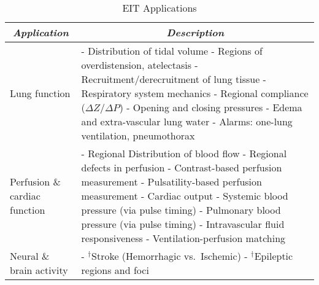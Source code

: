\documentclass[12pt]{article} \usepackage[margin=3cm]{geometry} \usepackage[margin=20pt,font=small,labelfont=bf]{caption}\def\TBLWIDA{35mm}\def\TBLWIDB{95mm}
\begin{document}
\begin{table}
\caption{EIT Applications}
\label{tbl:EIT_Applications}
\centering
\begin{tabular}{p{\TBLWIDA}p{\TBLWIDB}}
\multicolumn{1}{c}{\em Application} &
\multicolumn{1}{c}{\em Description} \\
\hline
Lung function &
 - Distribution of tidal volume \cite{Hahn1995Distribution}
      \newline
 - Regions of overdistension, atelectasis
                \cite{Gomez2012Overdistension, Costa2009Bedside}
      \newline
 - Recruitment/derecruitment of lung tissue \cite{Frerichs2003Regional}
      \newline
 - Respiratory system mechanics 
      \newline
 - Regional compliance ($\Delta Z/\Delta P$) 
      \newline
 - Opening and closing pressures \cite{Pulletz2012Opening}
      \newline
 - Edema and extra-vascular lung water \cite{Trepte2016Edema}
      \newline
 - Alarms: one-lung ventilation, pneumothorax 
\\
    \hline
Perfusion  \& \newline
cardiac \newline function & 
 - Regional Distribution of blood flow 
      \newline
 - Regional defects in perfusion 
      \newline
 - Contrast-based perfusion measurement \cite{Frerichs2002Perfusion}
      \newline
 - Pulsatility-based perfusion measurement \cite{Smit2003Perfusion}
      \newline
 - Cardiac output 
      \newline
 - Systemic blood pressure  (via pulse timing) \cite{Sola2011Central}
      \newline
 - Pulmonary blood pressure (via pulse timing) \cite{Proenca2016Noninvasive}
      \newline
 - Intravascular fluid responsiveness \cite{Trepte2017StrokeVolume}
      \newline
 - Ventilation-perfusion matching 
\\
    \hline
Neural \& \newline
brain activity &
 - $^\dagger$Stroke (Hemorrhagic vs.\ Ischemic) \cite{Romsauerova2006mfEIT}
      \newline
 - $^\dagger$Epileptic regions and foci 

\end{tabular}
\end{table}
\end{document}
